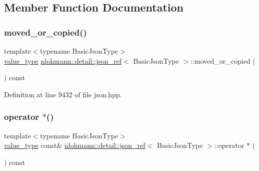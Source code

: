 \subsection{Member Function Documentation}
\mbox{\label{classnlohmann_1_1detail_1_1json__ref_ae39e523218bf05cac3fb5b5b1cd5efb6}} 
\subsubsection{\texorpdfstring{moved\_or\_copied()}{moved\_or\_copied()}}
{\footnotesize\ttfamily template$<$typename Basic\+Json\+Type$>$ \\
\mbox{\hyperlink{classnlohmann_1_1detail_1_1json__ref_a78d76cf288141049568c0d670ed670ef}{value\+\_\+type}} \mbox{\hyperlink{classnlohmann_1_1detail_1_1json__ref}{nlohmann\+::detail\+::json\+\_\+ref}}$<$ Basic\+Json\+Type $>$\+::moved\+\_\+or\+\_\+copied (\begin{DoxyParamCaption}{ }\end{DoxyParamCaption}) const\hspace{0.3cm}{\ttfamily [inline]}}



Definition at line 9432 of file json.\+hpp.

\mbox{\label{classnlohmann_1_1detail_1_1json__ref_af96699d7e27c3b1f9d778fe142f8bb41}} 
\subsubsection{\texorpdfstring{operator $\ast$()}{operator *()}}
{\footnotesize\ttfamily template$<$typename Basic\+Json\+Type$>$ \\
\mbox{\hyperlink{classnlohmann_1_1detail_1_1json__ref_a78d76cf288141049568c0d670ed670ef}{value\+\_\+type}} const\& \mbox{\hyperlink{classnlohmann_1_1detail_1_1json__ref}{nlohmann\+::detail\+::json\+\_\+ref}}$<$ Basic\+Json\+Type $>$\+::operator $\ast$ (\begin{DoxyParamCaption}{ }\end{DoxyParamCaption}) const\hspace{0.3cm}{\ttfamily [inline]}}



